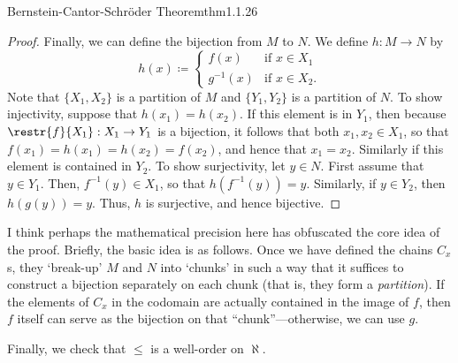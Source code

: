 \begin{thm}{Bernstein-Cantor-Schröder Theorem}{thm1.1.26}
\begin{proof}
		Finally, we can define the bijection from $M$ to $N$.  We define $h \colon M\rightarrow N$ by
		\begin{equation}
		h(x)\coloneqq \begin{cases}f(x) & \text{if }x\in X_1 \\ g^{-1}(x) & \text{if }x\in X_2.\end{cases}
		\end{equation}
		Note that $\{ X_1,X_2\}$ is a partition of $M$ and $\{ Y_1,Y_2\}$ is a partition of $N$.  To show injectivity, suppose that $h(x_1)=h(x_2)$.  If this element is in $Y_1$, then because $\restr{f}{X_1}:X_1\rightarrow Y_1$ is a bijection, it follows that both $x_1,x_2\in X_1$, so that $f(x_1)=h(x_1)=h(x_2)=f(x_2)$, and hence that $x_1=x_2$.  Similarly if this element is contained in $Y_2$.  To show surjectivity, let $y\in N$.  First assume that $y\in Y_1$.  Then, $f^{-1}(y)\in X_1$, so that $h\left( f^{-1}(y)\right) =y$.  Similarly, if $y\in Y_2$, then $h\left( g(y)\right) =y$.  Thus, $h$ is surjective, and hence bijective.
	\end{proof}
	\begin{rmk}
		I think perhaps the mathematical precision here has obfuscated the core idea of the proof.  Briefly, the basic idea is as follows.  Once we have defined the chains $C_x$s, they `break-up' $M$ and $N$ into `chunks' in such a way that it suffices to construct a bijection separately on each chunk (that is, they form a \emph{partition}).  If the elements of $C_x$ in the codomain are actually contained in the image of $f$, then $f$ itself can serve as the bijection on that ``chunk''---otherwise, we can use $g$.
	\end{rmk}
\end{thm}
Finally, we check that $\leq$ is a well-order on $\aleph$.
